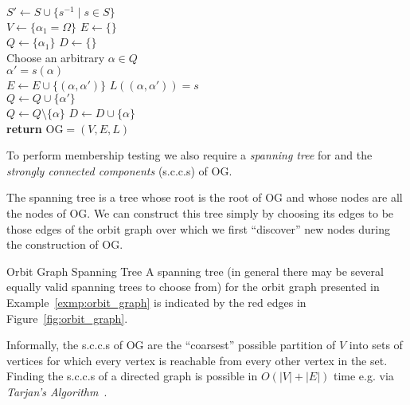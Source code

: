 \begin{algorithm}
  \caption{Construct orbit graph.}
  \label{alg:orbit_graph_construction}
  \begin{algorithmic}[1]
       \\
       \State $S' \gets S \cup \{s^{-1} \mid s \in S\}$
       \\
       \State $V \gets \{\alpha_1 = \Omega\}$
       \State $E \gets \{\}$
       \\
       \State $Q \gets \{\alpha_1\}$
       \State $D \gets \{\}$
       \\
         \State Choose an arbitrary $\alpha \in Q$
         \\
            \State $\alpha' = s(\alpha)$
            \\
            \State $E \gets E \cup \{(\alpha, \alpha')\}$
            \State $L((\alpha, \alpha')) = s$
            \\
              \State $Q \gets Q \cup \{\alpha'\}$
            \EndIf
         \EndFor
         \\
         \State $Q \gets Q \setminus \{\alpha\}$
         \State $D \gets D \cup \{\alpha\}$
       \EndWhile
       \\
       \State \textbf{return} $\mathrm{OG} = (V, E, L)$
    \EndProcedure
  \end{algorithmic}
\end{algorithm}

\noindent
To perform membership testing we also require a \textit{spanning tree} for
and the \textit{strongly connected components} (s.c.c.s) of $\mathrm{OG}$.

The spanning tree is a tree whose root is the root of $\mathrm{OG}$ and whose
nodes are all the nodes of $\mathrm{OG}$. We can construct this tree simply by
choosing its edges to be those edges of the orbit graph over which we first
``discover'' new nodes during the construction of $\mathrm{OG}$.

\begin{exmp}{Orbit Graph Spanning Tree}
  A spanning tree (in general there may be several equally valid spanning trees
  to choose from) for the orbit graph presented in Example~\ref{exmp:orbit_graph}
  is indicated by the red edges in Figure~\ref{fig:orbit_graph}.
\end{exmp}
%
Informally, the s.c.c.s of $\mathrm{OG}$ are the ``coarsest'' possible
partition of $V$ into sets of vertices for which every vertex is reachable from
every other vertex in the set. Finding the s.c.c.s of a directed graph is
possible in $O(|V| + |E|)$ time e.g.  via \textit{Tarjan's
Algorithm}~\cite{Tarjan}.

